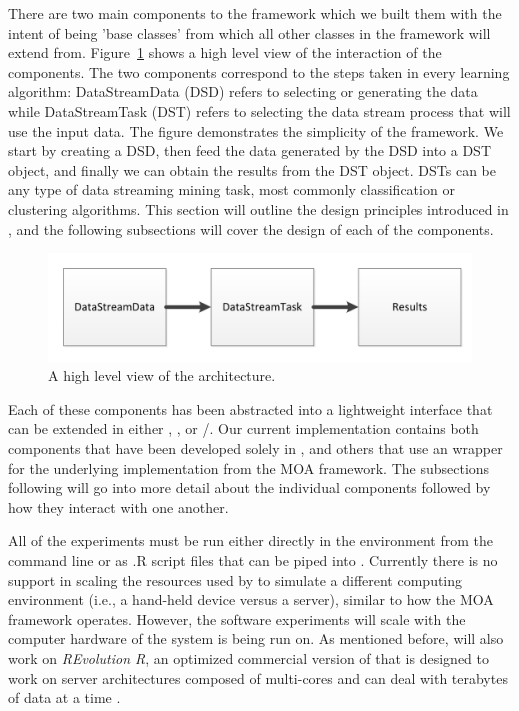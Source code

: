 \documentclass[nojss]{jss}
\begin{document}
There are two main components to the  framework which we built them with the intent of being 'base classes' from which all other classes in the framework will extend from. Figure~\ref{figure:workflow}  shows a high level view of the interaction of the components. The two components correspond to the steps taken in every learning algorithm: DataStreamData (DSD) refers to selecting or generating the data while DataStreamTask (DST) refers to selecting the data stream process that will use the input data. The figure demonstrates the simplicity of the framework. We start by creating a DSD, then feed the data generated by the DSD into a DST object, and finally we can obtain the results from the DST object. DSTs can be any type of data streaming mining task, most commonly classification or clustering algorithms. This section will outline the design principles introduced in , and the following subsections will cover the design of each of the components. 

\begin{figure}
\centering
\includegraphics{architecture}
\caption{A high level view of the  architecture.}
\label{figure:workflow}
\end{figure}

Each of these components has been abstracted into a lightweight interface that can be extended in either , , or /. Our current implementation contains both components that have been developed solely in , and others that use an  wrapper for the underlying  implementation from the MOA framework. The subsections following will go into more detail about the individual components followed by how they interact with one another.


All of the experiments must be run either directly in the  environment from the command line or as .R script files that can be piped into . Currently there is no support in scaling the resources used by  to simulate a different computing environment (i.e., a hand-held device versus a server), similar to how the MOA framework operates. However, the software experiments will scale with the computer hardware of the system  is being run on. As mentioned before,  will also work on \textit{REvolution R}, an optimized commercial version of  that is designed to work on server architectures composed of multi-cores and can deal with terabytes of data at a time \citep{stream:revolutionR:2010}.
\end{document}

